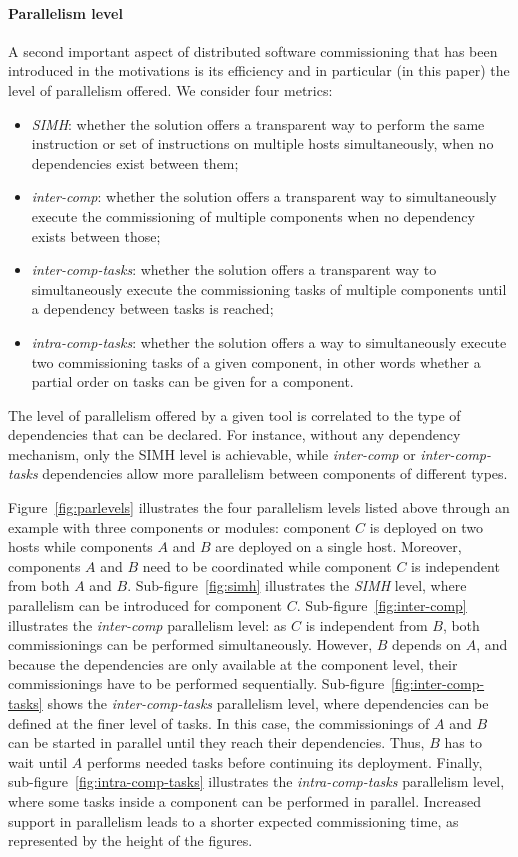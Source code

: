 \paragraph{Parallelism level}
A second important aspect of distributed software commissioning that
has been introduced in the motivations is its efficiency and in
particular (in this paper) the level of parallelism offered. We
consider four metrics:
\begin{itemize}
\item \emph{SIMH}: whether the solution offers a transparent way to
  perform the same instruction or set of instructions on multiple
  hosts simultaneously, when no dependencies exist between them;
\item \emph{inter-comp}: whether the solution offers a transparent way
  to simultaneously execute the commissioning of multiple components
  when no dependency exists between those;
\item \emph{inter-comp-tasks}: whether the solution offers a
  transparent way to simultaneously execute the commissioning tasks of
  multiple components until a dependency between tasks is reached;
\item \emph{intra-comp-tasks}: whether the solution offers a way to
  simultaneously execute two commissioning tasks of a given component,
  in other words whether a partial order on tasks can be given for a
  component.
\end{itemize}
The level of parallelism offered by a given tool is correlated to the
type of dependencies that can be declared. For instance, without any
dependency mechanism, only the SIMH level is achievable, while
\emph{inter-comp} or \emph{inter-comp-tasks} dependencies allow more
parallelism between components of different types.

Figure~\ref{fig:parlevels} illustrates the four parallelism levels
listed above through an example with three components or modules:
component $C$ is deployed on two hosts while components $A$ and $B$
are deployed on a single host. Moreover, components $A$ and $B$ need
to be coordinated while component $C$ is independent from both $A$ and
$B$. Sub-figure~\ref{fig:simh} illustrates the \emph{SIMH} level,
where parallelism can be introduced for component
$C$. Sub-figure~\ref{fig:inter-comp} illustrates the \emph{inter-comp}
parallelism level: as $C$ is independent from $B$, both commissionings
can be performed simultaneously. However, $B$ depends on $A$, and
because the dependencies are only available at the component level,
their commissionings have to be performed
sequentially. Sub-figure~\ref{fig:inter-comp-tasks} shows the
\emph{inter-comp-tasks} parallelism level, where dependencies can be
defined at the finer level of tasks. In this case, the commissionings
of $A$ and $B$ can be started in parallel until they reach their
dependencies. Thus, $B$ has to wait until $A$ performs needed tasks
before continuing its deployment. Finally,
sub-figure~\ref{fig:intra-comp-tasks} illustrates the
\emph{intra-comp-tasks} parallelism level, where some tasks inside a
component can be performed in parallel. Increased support in
parallelism leads to a shorter expected commissioning time, as
represented by the height of the figures.


